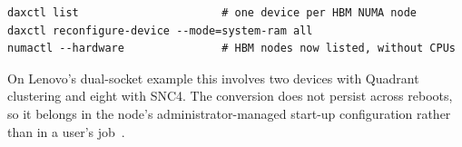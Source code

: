 \begin{lstlisting}[style=shell,
  caption={Converting the HBM DAX devices of a Flat-mode node to system
  RAM.  Requires root; device names are read from the running system.}]
daxctl list                      # one device per HBM NUMA node
daxctl reconfigure-device --mode=system-ram all
numactl --hardware               # HBM nodes now listed, without CPUs
\end{lstlisting}

On Lenovo's dual-socket example this involves two devices with Quadrant
clustering and eight with SNC4.  The conversion does not persist across
reboots, so it belongs in the node's administrator-managed start-up
configuration rather than in a user's job~\cite{lp1738}.
